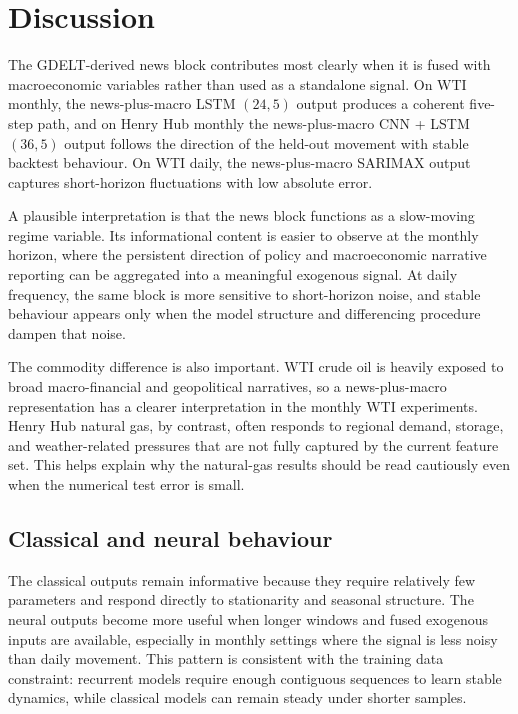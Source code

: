 \documentclass[11pt,a4paper]{article}
\begin{document}
\section{Discussion}\label{sec:discussion}

The GDELT-derived news block contributes most clearly when it is fused with macroeconomic variables rather than used as a standalone signal. On WTI monthly, the news-plus-macro LSTM $(24,5)$ output produces a coherent five-step path, and on Henry Hub monthly the news-plus-macro CNN + LSTM $(36,5)$ output follows the direction of the held-out movement with stable backtest behaviour. On WTI daily, the news-plus-macro SARIMAX output captures short-horizon fluctuations with low absolute error.

A plausible interpretation is that the news block functions as a slow-moving regime variable. Its informational content is easier to observe at the monthly horizon, where the persistent direction of policy and macroeconomic narrative reporting can be aggregated into a meaningful exogenous signal. At daily frequency, the same block is more sensitive to short-horizon noise, and stable behaviour appears only when the model structure and differencing procedure dampen that noise.

The commodity difference is also important. WTI crude oil is heavily exposed to broad macro-financial and geopolitical narratives, so a news-plus-macro representation has a clearer interpretation in the monthly WTI experiments. Henry Hub natural gas, by contrast, often responds to regional demand, storage, and weather-related pressures that are not fully captured by the current feature set. This helps explain why the natural-gas results should be read cautiously even when the numerical test error is small.

\subsection{Classical and neural behaviour}

The classical outputs remain informative because they require relatively few parameters and respond directly to stationarity and seasonal structure. The neural outputs become more useful when longer windows and fused exogenous inputs are available, especially in monthly settings where the signal is less noisy than daily movement. This pattern is consistent with the training data constraint: recurrent models require enough contiguous sequences to learn stable dynamics, while classical models can remain steady under shorter samples.
\end{document}
